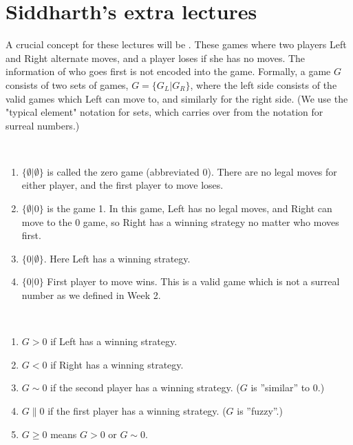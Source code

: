 \section{ Siddharth's extra lectures }

A crucial concept for these lectures will be . These games where two players Left and Right alternate moves, and a player loses if she has no moves. The information of who goes first is not encoded into the game. Formally, a game $G$ consists of two sets of games, $G=\{G_L|G_R\}$, where the left side consists of the valid games which Left can move to, and similarly for the right side. (We use the "typical element" notation for sets, which carries over from the notation for surreal numbers.)

\begin{example}\ %
\begin{enumerate}
  \item  $\{\emptyset|\emptyset\}$ is called the zero game (abbreviated 0). There are no legal moves for either player, and the first player to move loses.
  \item  $\{\emptyset|0\}$ is the game 1. In this game, Left has no legal moves, and Right can move to the 0 game, so Right has a winning strategy no matter who moves first.
  \item  $\{0|\emptyset\}$. Here Left has a winning strategy.
  \item  $\{0|0\}$ First player to move wins. This is a valid game which is not a surreal number as we defined in Week 2.
\end{enumerate}
\end{example}

\begin{definition}\ %
\begin{enumerate}
  \item  $G>0$ if Left has a winning strategy.
  \item  $G<0$ if Right has a winning strategy.
  \item  $G\sim 0$ if the second player has a winning strategy. ($G$ is ''similar'' to $0$.)
  \item  $G\parallel 0$ if the first player has a winning strategy. ($G$ is ''fuzzy''.)
  \item  $G\ge 0$ means $G>0$ or $G\sim 0$.
\end{enumerate}
 \end{definition}

